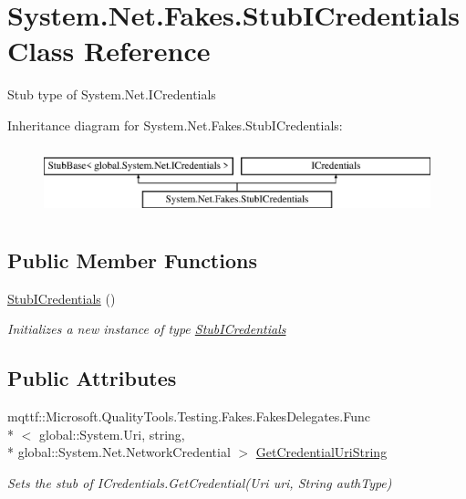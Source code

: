 \hypertarget{class_system_1_1_net_1_1_fakes_1_1_stub_i_credentials}{\section{System.\-Net.\-Fakes.\-Stub\-I\-Credentials Class Reference}
\label{class_system_1_1_net_1_1_fakes_1_1_stub_i_credentials}
}


Stub type of System.\-Net.\-I\-Credentials 


Inheritance diagram for System.\-Net.\-Fakes.\-Stub\-I\-Credentials\-:\begin{figure}[H]
\begin{center}
\leavevmode
\includegraphics[height=2.000000cm]{class_system_1_1_net_1_1_fakes_1_1_stub_i_credentials}
\end{center}
\end{figure}
\subsection*{Public Member Functions}
\begin{DoxyCompactItemize}
\item 
\hyperlink{class_system_1_1_net_1_1_fakes_1_1_stub_i_credentials_a5cf5eb142093b09e83e70a3ebc15a6f1}{Stub\-I\-Credentials} ()
\begin{DoxyCompactList}\small\item\em Initializes a new instance of type \hyperlink{class_system_1_1_net_1_1_fakes_1_1_stub_i_credentials}{Stub\-I\-Credentials}\end{DoxyCompactList}\end{DoxyCompactItemize}
\subsection*{Public Attributes}
\begin{DoxyCompactItemize}
\item 
mqttf\-::\-Microsoft.\-Quality\-Tools.\-Testing.\-Fakes.\-Fakes\-Delegates.\-Func\\*
$<$ global\-::\-System.\-Uri, string, \\*
global\-::\-System.\-Net.\-Network\-Credential $>$ \hyperlink{class_system_1_1_net_1_1_fakes_1_1_stub_i_credentials_a079f934db013e163849b10a0be514fd1}{Get\-Credential\-Uri\-String}
\begin{DoxyCompactList}\small\item\em Sets the stub of I\-Credentials.\-Get\-Credential(\-Uri uri, String auth\-Type)\end{DoxyCompactList}\end{DoxyCompactItemize}


